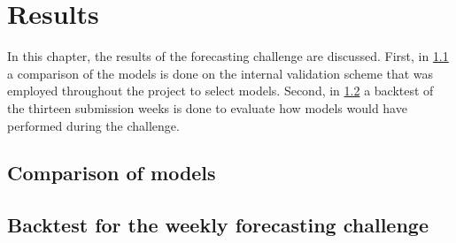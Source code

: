\newpage
\section{Results}
\label{ch:Results}

In this chapter, the results of the forecasting challenge are discussed. First, in \cref{sec:Results:ComparisonModels} a comparison of the models is done on the internal validation scheme that was employed throughout the project to select models. Second, in \cref{sec:Results:Backtest} a backtest of the thirteen submission weeks is done to evaluate how models would have performed during the challenge. 

\subsection{Comparison of models}
\label{sec:Results:ComparisonModels}


\subsection{Backtest for the weekly forecasting challenge}
\label{sec:Results:Backtest}

